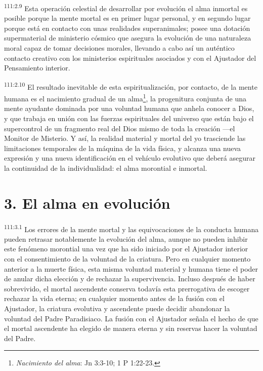 \par
\textsuperscript{111:2.9} Esta operación celestial de desarrollar por evolución el alma inmortal es posible porque la mente mortal es en primer lugar personal, y en segundo lugar porque está en contacto con unas realidades superanimales; posee una dotación supermaterial de ministerio cósmico que asegura la evolución de una naturaleza moral capaz de tomar decisiones morales, llevando a cabo así un auténtico contacto creativo con los ministerios espirituales asociados y con el Ajustador del Pensamiento interior.

\par
\textsuperscript{111:2.10} El resultado inevitable de esta espiritualización, por contacto, de la mente humana es el nacimiento gradual de un alma\footnote{\textit{Nacimiento del alma}: Jn 3:3-10; 1 P 1:22-23.}, la progenitura conjunta de una mente ayudante dominada por una voluntad humana que anhela conocer a Dios, y que trabaja en unión con las fuerzas espirituales del universo que están bajo el supercontrol de un fragmento real del Dios mismo de toda la creación ---el Monitor de Misterio. Y así, la realidad material y mortal del yo trasciende las limitaciones temporales de la máquina de la vida física, y alcanza una nueva expresión y una nueva identificación en el vehículo evolutivo que deberá asegurar la continuidad de la individualidad: el alma morontial e inmortal.

\section*{3. El alma en evolución}
\par
\textsuperscript{111:3.1} Los errores de la mente mortal y las equivocaciones de la conducta humana pueden retrasar notablemente la evolución del alma, aunque no pueden inhibir este fenómeno morontial una vez que ha sido iniciado por el Ajustador interior con el consentimiento de la voluntad de la criatura. Pero en cualquier momento anterior a la muerte física, esta misma voluntad material y humana tiene el poder de anular dicha elección y de rechazar la supervivencia. Incluso después de haber sobrevivido, el mortal ascendente conserva todavía esta prerrogativa de escoger rechazar la vida eterna; en cualquier momento antes de la fusión con el Ajustador, la criatura evolutiva y ascendente puede decidir abandonar la voluntad del Padre Paradisiaco. La fusión con el Ajustador señala el hecho de que el mortal ascendente ha elegido de manera eterna y sin reservas hacer la voluntad del Padre.

